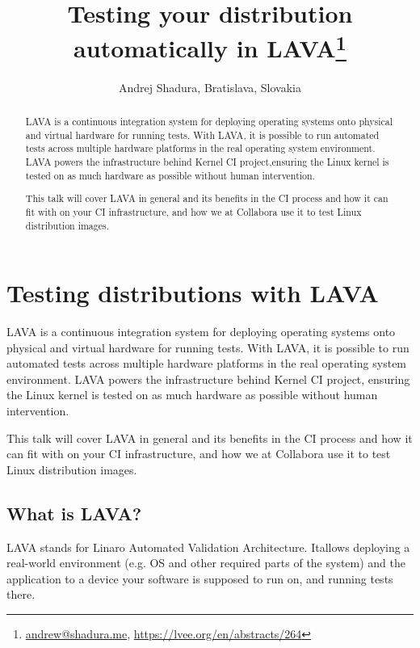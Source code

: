 \documentclass[10pt, a5paper]{article}
\begin{document}
\title{Testing your distribution automatically in LAVA\footnote{\url{andrew@shadura.me}, \url{https://lvee.org/en/abstracts/264}}}
\author{ Andrej Shadura, Bratislava, Slovakia}
\maketitle
\begin{abstract}
LAVA is a continuous integration system for deploying operating systems onto physical and virtual hardware for running tests. With LAVA, it is possible to run automated tests across multiple hardware platforms in the real operating system environment. LAVA powers the infrastructure behind Kernel CI project,\linebreak ensuring the Linux kernel is tested on as much hardware as possible without human intervention.

This talk will cover LAVA in general and its benefits in the CI process and how it can fit with on your CI infrastructure, and how we at Collabora use it to test Linux distribution images.
\end{abstract}
\section*{Testing distributions with LAVA}

LAVA is a continuous integration system for deploying operating systems onto physical and virtual hardware for running tests. With LAVA, it is possible to run automated tests across multiple hardware platforms in the real operating system environment. LAVA powers the infrastructure behind Kernel CI project, ensuring the Linux kernel is tested on as much hardware as possible without human intervention.

This talk will cover LAVA in general and its benefits in the CI process and how it can fit with on your CI infrastructure, and how we at Collabora use it to test Linux distribution images.

\subsection*{What is LAVA?}

LAVA stands for Linaro Automated Validation Architecture. It\linebreak allows deploying a real-world environment (e.g. OS and other required parts of the system) and the application to a device your software is supposed to run on, and running tests there.
\end{document}
